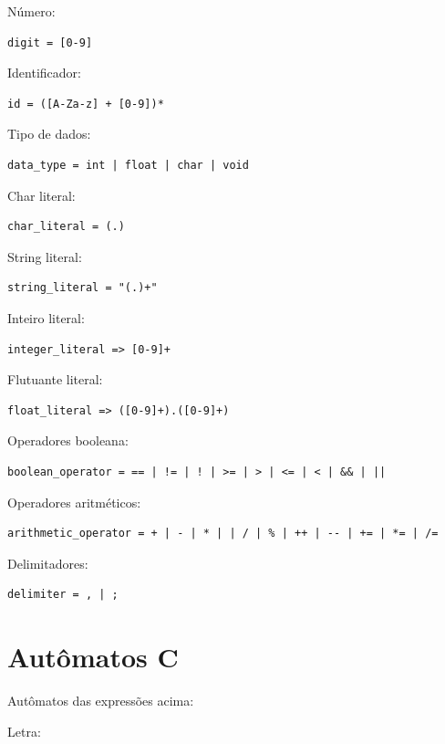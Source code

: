 \documentclass[]{article}
\numberwithin{equation}{section}
\begin{document}
Número:
\begin{lstlisting}
digit = [0-9]
\end{lstlisting}

Identificador:
\begin{lstlisting}
id = ([A-Za-z] + [0-9])*
\end{lstlisting}

Tipo de dados:
\begin{lstlisting}
data_type = int | float | char | void
\end{lstlisting}

Char literal:
\begin{lstlisting}
char_literal = (.)
\end{lstlisting}

String literal:
\begin{lstlisting}
string_literal = "(.)+"
\end{lstlisting}

Inteiro literal:
\begin{lstlisting}
integer_literal => [0-9]+
\end{lstlisting}

Flutuante literal:
\begin{lstlisting}
float_literal => ([0-9]+).([0-9]+)
\end{lstlisting}

Operadores booleana:
\begin{lstlisting}
boolean_operator = == | != | ! | >= | > | <= | < | && | ||
\end{lstlisting}

Operadores aritméticos:
\begin{lstlisting}
arithmetic_operator = + | - | * | | / | % | ++ | -- | += | *= | /=
\end{lstlisting}

Delimitadores:
\begin{lstlisting}
delimiter = , | ; 
\end{lstlisting}

\section{Autômatos C}
Autômatos das expressões acima:

Letra:
\begin{center}
\end{center}
\end{document}
